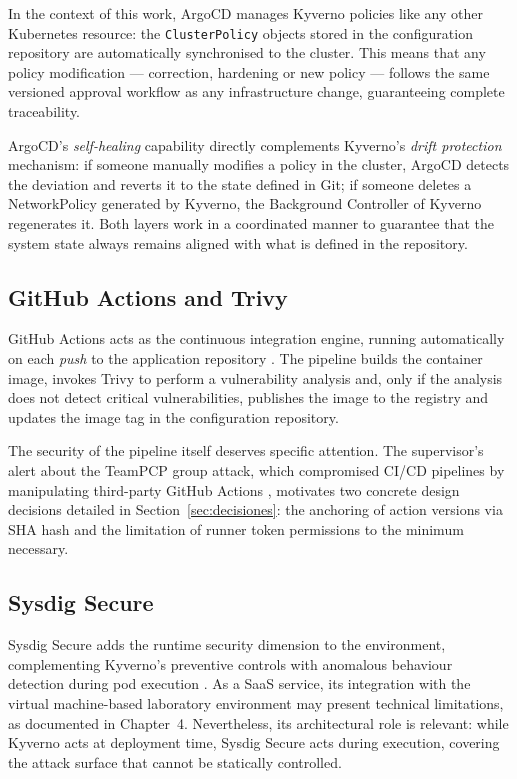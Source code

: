 In the context of this work, ArgoCD manages Kyverno policies like any other Kubernetes resource: the \texttt{ClusterPolicy} objects stored in the configuration repository are automatically synchronised to the cluster. This means that any policy modification --- correction, hardening or new policy --- follows the same versioned approval workflow as any infrastructure change, guaranteeing complete traceability.

ArgoCD's \textit{self-healing} capability directly complements Kyverno's \textit{drift protection} mechanism: if someone manually modifies a policy in the cluster, ArgoCD detects the deviation and reverts it to the state defined in Git; if someone deletes a NetworkPolicy generated by Kyverno, the Background Controller of Kyverno regenerates it. Both layers work in a coordinated manner to guarantee that the system state always remains aligned with what is defined in the repository.

\subsection{GitHub Actions and Trivy}

GitHub Actions acts as the continuous integration engine, running automatically on each \textit{push} to the application repository \cite{github_actions_docs}. The pipeline builds the container image, invokes Trivy to perform a vulnerability analysis \cite{trivy_docs} and, only if the analysis does not detect critical vulnerabilities, publishes the image to the registry and updates the image tag in the configuration repository.

The security of the pipeline itself deserves specific attention. The supervisor's alert about the TeamPCP group attack, which compromised CI/CD pipelines by manipulating third-party GitHub Actions \cite{teampcp2026}, motivates two concrete design decisions detailed in Section~\ref{sec:decisiones}: the anchoring of action versions via SHA hash and the limitation of runner token permissions to the minimum necessary.

\subsection{Sysdig Secure}

Sysdig Secure adds the runtime security dimension to the environment, complementing Kyverno's preventive controls with anomalous behaviour detection during pod execution \cite{sysdig_secure}. As a SaaS service, its integration with the virtual machine-based laboratory environment may present technical limitations, as documented in Chapter~4. Nevertheless, its architectural role is relevant: while Kyverno acts at deployment time, Sysdig Secure acts during execution, covering the attack surface that cannot be statically controlled.

